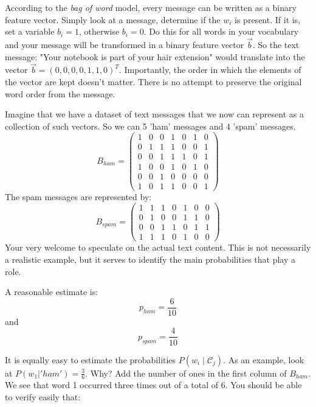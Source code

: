 According to the \emph{bag of word} model, every message can be written as a binary feature vector. Simply look at a message, determine if the $w_i$ is present. If it is, set a variable $b_i =1$, otherwise $b_i = 0$. Do this for all words in your vocabulary and your message will be transformed in a binary feature vector $\vec{b}$. So the text message: "Your notebook is part of your hair extension" would translate into the vector $\vec{b} = (0, 0, 0, 0, 1, 1, 0)^T$. Importantly, the order in which the elements of the vector are kept doesn't matter. There is no attempt to preserve the original word order from the message.

Imagine that we have a dataset of text messages that we now can represent as a collection of such vectors. So we can 5 'ham' messages and 4 'spam' messages.
$$
B_{ham} = \begin{pmatrix} 1 & 0 & 0 & 1 & 0 & 1 & 0 \\
                          0 & 1 & 1 & 1 & 0 & 0 & 1 \\
                          0 & 0 & 1 & 1 & 1 & 0 & 1 \\
                          1 & 0 & 0 & 1 & 0 & 1 & 0 \\
                          0 & 0 & 1 & 0 & 0 & 0 & 0 \\
                          1 & 0 & 1 & 1 & 0 & 0 & 1
                          \end{pmatrix}
$$
The spam messages are represented by:
$$
B_{spam} = \begin{pmatrix} 1 & 1 & 1 & 0 & 1 & 0 & 0\\
                           0 & 1 & 0 & 0 & 1 & 1 & 0 \\
                           0 & 0 & 1 & 1 & 0 & 1 & 1\\
                           1 & 1 & 1 & 0 & 1 & 0 & 0
                           \end{pmatrix}
$$
Your very welcome to speculate on the actual text content. This is not necessarily a realistic example, but it serves to identify the main probabilities that play a role.

A reasonable estimate is:
$$
p_{ham} = \frac{6}{10}
$$
and
$$
p_{spam} = \frac{4}{10}
$$

It is equally easy to estimate the probabilities $P(w_i \mid \mathcal{C}_j)$. As an example, look at
$P(w_1 | 'ham') = \frac{3}{6}$. Why? Add the number of ones in the first column of $B_{ham}$. We see that word 1
occurred three times out of a total of 6. You should be able to verify easily that:


